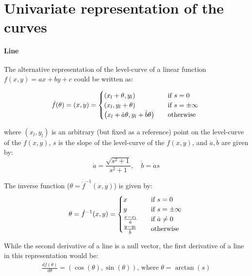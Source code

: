 \section{Univariate representation of the curves} \label{app:alternativeRep}

\paragraph{Line}
The alternative representation of the level-curve of a linear function $f(x,y)=ax+by+c$ could be written as:

\[
\dot{f}(\theta) = (x,y) =
\begin{cases}
  \left( x_l + \theta, y_l \right) & \quad \text{if } s = 0\\
  \left( x_l, y_l + \theta \right) & \quad \text{if } s = \pm \infty\\
  \left( x_l + \dot{a}\theta , y_l + \dot{b}\theta \right) & \quad \text{otherwise} \\
\end{cases}\\
\]

where $(x_l,y_l)$ is an arbitrary (but fixed as a reference) point on the level-curve of the $f(x,y)$, $s$ is the slope of the level-curve of the $f(x,y)$, and $\dot{a}, \dot{b}$ are given by:
\[
\dot{a} = \frac{\sqrt{ s^2 + 1}}{s^2 + 1}, \quad \dot{b} = \dot{a}s
\]

The inverse function ($\theta = \dot{f}^{-1}(x,y)$) is given by:
\[
\theta = \dot{f}^{-1}(x,y) =
\begin{cases}
  x & \quad \text{if } s = 0\\
  y & \quad \text{if } s = \pm \infty\\
  \frac{x-x_l}{\dot{a}} & \quad \text{if } \dot{a} \neq 0\\
  \frac{y-y_l}{\dot{b}} & \quad \text{otherwise} \\
\end{cases}\\
\]

While the second derivative of a line is a null vector, the first derivative of a line in this representation would be:
\[
\begin{array}{l}
  \frac{d\dot{f}(\theta)}{d\theta} = \left( \cos(\theta) , \sin(\theta) \right) \text{, where } \theta = \arctan(s)\\
\end{array}
\]



